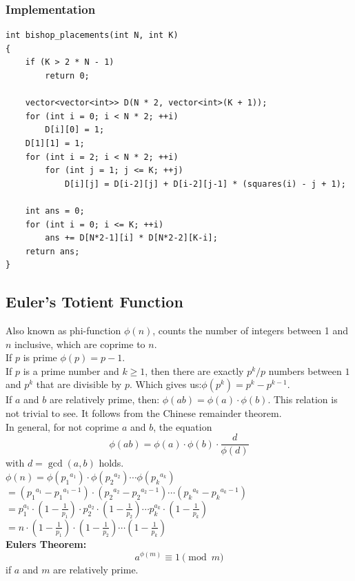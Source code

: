 \documentclass[8pt, a4paper, oneside, twocolumn]{extarticle}
\begin{document}
\subsubsection{Implementation}
\begin{verbatim}
int bishop_placements(int N, int K)
{
    if (K > 2 * N - 1)
        return 0;

    vector<vector<int>> D(N * 2, vector<int>(K + 1));
    for (int i = 0; i < N * 2; ++i)
        D[i][0] = 1;
    D[1][1] = 1;
    for (int i = 2; i < N * 2; ++i)
        for (int j = 1; j <= K; ++j)
            D[i][j] = D[i-2][j] + D[i-2][j-1] * (squares(i) - j + 1);

    int ans = 0;
    for (int i = 0; i <= K; ++i)
        ans += D[N*2-1][i] * D[N*2-2][K-i];
    return ans;
}
\end{verbatim}
\subsection{Euler's Totient Function}
Also known as phi-function $\phi (n)$, counts the number of integers between 1 and $n$ inclusive, which are coprime to $n$.
\\If $p$ is prime $\phi (p) = p - 1.$
\\If $p$ is a prime number and $k \ge 1$, then there are exactly $p^k / p$ numbers between $1$ and $p^k$ that are divisible by $p$. Which gives us:$\phi(p^k) = p^k - p^{k-1}.$
\\If $a$ and $b$ are relatively prime, then: $\phi(a b) = \phi(a) \cdot \phi(b).$ This relation is not trivial to see. It follows from the Chinese remainder theorem.
\\In general, for not coprime $a$ and $b$, the equation $$\phi(ab) = \phi(a) \cdot \phi(b) \cdot \dfrac{d}{\phi(d)}$$ with $d = \gcd(a, b)$ holds.\\
$ \phi (n) = \phi ({p_1}^{a_1}) \cdot \phi ({p_2}^{a_2}) \cdots \phi ({p_k}^{a_k})$\\
$ = \left({p_1}^{a_1} - {p_1}^{a_1 - 1}\right) \cdot \left({p_2}^{a_2} - {p_2}^{a_2 - 1}\right) \cdots \left({p_k}^{a_k} - {p_k}^{a_k - 1}\right)$\\
$ = p_1^{a_1} \cdot \left(1 - \frac{1}{p_1}\right) \cdot p_2^{a_2} \cdot \left(1 - \frac{1}{p_2}\right) \cdots p_k^{a_k} \cdot \left(1 - \frac{1}{p_k}\right)$ \\ 
$= n \cdot \left(1 - \frac{1}{p_1}\right) \cdot \left(1 - \frac{1}{p_2}\right) \cdots \left(1 - \frac{1}{p_k}\right) $\\
\textbf{Eulers Theorem: }\\
$$a^{\phi(m)} \equiv 1 \pmod m$$ if $a$ and $m$ are relatively prime.
\end{document}
